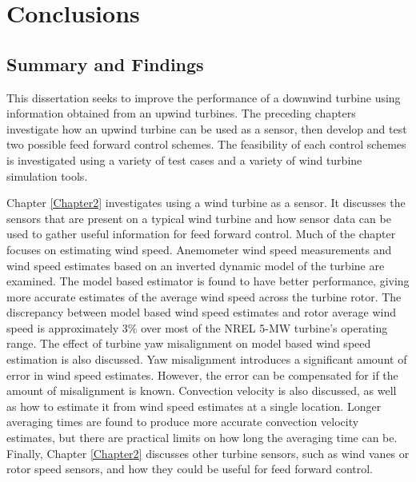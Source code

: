 
\chapter{Conclusions} %

\label{Chapter7} %



\section{Summary and Findings}

This dissertation seeks to improve the performance of a downwind turbine using information obtained from an upwind turbines. The preceding chapters investigate how an upwind turbine can be used as a sensor, then develop and test two possible feed forward control schemes. The feasibility of each control schemes is investigated using a variety of test cases and a variety of wind turbine simulation tools.

Chapter \ref{Chapter2} investigates using a wind turbine as a sensor. It discusses the sensors that are present on a typical wind turbine and how sensor data can be used to gather useful information for feed forward control. Much of the chapter focuses on estimating wind speed. Anemometer wind speed measurements and wind speed estimates based on an inverted dynamic model of the turbine are examined. The model based estimator is found to have better performance, giving more accurate estimates of the average wind speed across the turbine rotor. The discrepancy between model based wind speed estimates and rotor average wind speed is approximately 3\% over most of the NREL 5-MW turbine's operating range. The effect of turbine yaw misalignment on model based wind speed estimation is also discussed. Yaw misalignment introduces a significant amount of error in wind speed estimates. However, the error can be compensated for if the amount of misalignment is known. Convection velocity is also discussed, as well as how to estimate it from wind speed estimates at a single location. Longer averaging times are found to produce more accurate convection velocity estimates, but there are practical limits on how long the averaging time can be. Finally, Chapter \ref{Chapter2} discusses other turbine sensors, such as wind vanes or rotor speed sensors, and how they could be useful for feed forward control.

